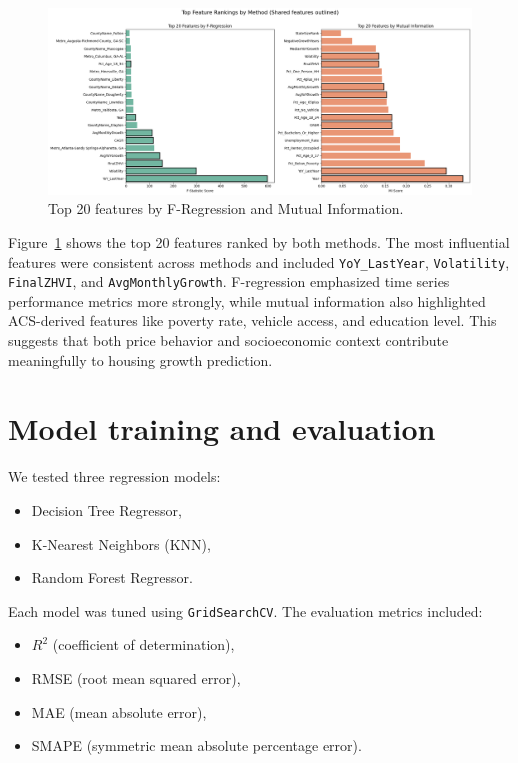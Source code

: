 \begin{figure}[!ht]
    \centering
    \includegraphics[width=\textwidth]{figures/topfeatures.png}
    \caption{Top 20 features by F-Regression and Mutual Information.}
    \label{fig:top_features}
\end{figure}
\FloatBarrier

Figure~\ref{fig:top_features} shows the top 20 features ranked by both methods. The most influential features were consistent across methods and included \texttt{YoY\_LastYear}, \texttt{Volatility}, \texttt{FinalZHVI}, and \texttt{AvgMonthlyGrowth}. F-regression emphasized time series performance metrics more strongly, while mutual information also highlighted ACS-derived features like poverty rate, vehicle access, and education level. This suggests that both price behavior and socioeconomic context contribute meaningfully to housing growth prediction.

\section{Model training and evaluation}
We tested three regression models:
\begin{itemize}
    \item Decision Tree Regressor,
    \item K-Nearest Neighbors (KNN),
    \item Random Forest Regressor.
\end{itemize}

Each model was tuned using \texttt{GridSearchCV}. The evaluation metrics included:
\begin{itemize}
    \item $R^2$ (coefficient of determination),
    \item RMSE (root mean squared error),
    \item MAE (mean absolute error),
    \item SMAPE (symmetric mean absolute percentage error).
\end{itemize}

